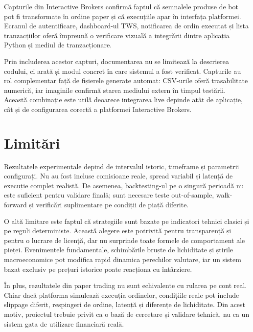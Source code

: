 Capturile din Interactive Brokers confirmă faptul că semnalele produse de bot pot fi transformate în ordine paper și că execuțiile apar în interfața platformei. Ecranul de autentificare, dashboard-ul TWS, notificarea de ordin executat și lista tranzacțiilor oferă împreună o verificare vizuală a integrării dintre aplicația Python și mediul de tranzacționare.

Prin includerea acestor capturi, documentarea nu se limitează la descrierea codului, ci arată și modul concret în care sistemul a fost verificat. Capturile au rol complementar față de fișierele generate automat: CSV-urile oferă trasabilitate numerică, iar imaginile confirmă starea mediului extern în timpul testării. Această combinație este utilă deoarece integrarea live depinde atât de aplicație, cât și de configurarea corectă a platformei Interactive Brokers.

\section{Limitări}
\label{cap:cap4:limitari}

Rezultatele experimentale depind de intervalul istoric, timeframe și parametrii configurați. Nu au fost incluse comisioane reale, spread variabil și latență de execuție complet realistă. De asemenea, backtesting-ul pe o singură perioadă nu este suficient pentru validare finală; sunt necesare teste out-of-sample, walk-forward și verificări suplimentare pe condiții de piață diferite.

O altă limitare este faptul că strategiile sunt bazate pe indicatori tehnici clasici și pe reguli deterministe. Această alegere este potrivită pentru transparență și pentru o lucrare de licență, dar nu surprinde toate formele de comportament ale pieței. Evenimentele fundamentale, schimbările bruște de lichiditate și știrile macroeconomice pot modifica rapid dinamica perechilor valutare, iar un sistem bazat exclusiv pe prețuri istorice poate reacționa cu întârziere.

În plus, rezultatele din paper trading nu sunt echivalente cu rularea pe cont real. Chiar dacă platforma simulează execuția ordinelor, condițiile reale pot include slippage diferit, respingeri de ordine, latență și diferențe de lichiditate. Din acest motiv, proiectul trebuie privit ca o bază de cercetare și validare tehnică, nu ca un sistem gata de utilizare financiară reală.
